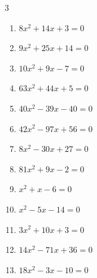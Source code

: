 \begin{multicols}{3}
\begin{enumerate}
  \item $8x^{2}+14x+3=0$


  \item $9x^{2}+25x+14=0$


  \item $10x^{2}+9x-7=0$


  \item $63x^{2}+44x+5=0$


  \item $40x^{2}-39x-40=0$


  \item $42x^{2}-97x+56=0$


  \item $8x^{2}-30x+27=0$


  \item $81x^{2}+9x-2=0$


  \item $x^{2}+x-6=0$

        \phantom{$\displaystyle x=2,\; -3$}

\columnbreak %

  \item $x^{2}-5x-14=0$

        \phantom{$\displaystyle x=-2,\; 7$}

  \item $3x^{2}+10x+3=0$


  \item $14x^{2}-71x+36=0$


  \item $18x^{2}-3x-10=0$


\end{enumerate}
\end{multicols}
